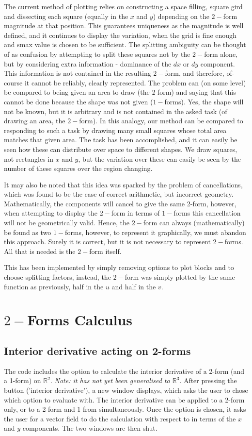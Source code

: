 \documentclass[12pt]{report}
\begin{document}
The current method of plotting relies on constructing a space filling, square gird and dissecting each square (equally in the $x$ and $y$) depending on the $2-$form magnitude at that position. This guarantees uniqueness as the magnitude is well defined, and it continues to display the variation, when the grid is fine enough and s\textunderscore max value is chosen to be sufficient.
The splitting ambiguity can be thought of as confusion by attempting to split these squares not by the $2-$form alone, but by considering extra information - dominance of the $dx$ or $dy$ component. This information is not contained in the resulting $2-$form, and therefore, of-course it cannot be reliably, clearly represented.
The problem can (on some level) be compared to being given an area to draw (the 2-form) and saying that this cannot be done because the shape was not given ($1-$forms). Yes, the shape will not be known, but it is arbitrary and is not contained in the asked task (of drawing an area, the $2-$form). In this analogy, our method can be compared to responding to such a task by drawing many small squares whose total area matches that given area. The task has been accomplished, and it can easily be seen how these can distribute over space to different shapes. We draw squares, not rectangles in $x$ and $y$, but the variation over these can easily be seen by the number of these squares over the region changing.

It may also be noted that this idea was sparked by the problem of cancellations, which was found to be the case of correct arithmetic, but incorrect geometry. Mathematically, the components will cancel to give the same 2-form, however, when attempting to display the $2-$form in terms of $1-$forms this cancellation will not be geometrically valid.
Hence, the $2-$form can always (mathematically) be found as two $1-$forms, however, to represent it graphically, we must abandon this approach. Surely it is correct, but it is not necessary to represent $2-$forms. All that is needed is the $2-$form itself.

This has been implemented by simply removing options to plot blocks and to choose splitting factors, instead, the $2-$form was simply plotted by the same function as previously, half in the $u$ and half in the $v$.

\chapter {$2-$Forms Calculus}
\section{Interior derivative acting on 2-forms}
The code includes the option to calculate the interior derivative of a 2-form (and a 1-form) on $\mathbb{R}^{2}$. \textit{Note: it has not yet been generalised to $\mathbb{R}^{3}$}. After pressing the button ('interior derivative'), a new window displays, which asks the user to chose which option to evaluate with. The interior derivative can be applied to a 2-form only, or to a 2-form and 1 from simultaneously. Once the option is chosen, it asks the user for a vector field to do the calculation with respect to in terms of the $x$ and $y$ components. The two windows are then shut.
\end{document}
